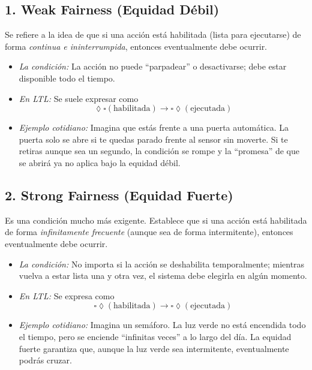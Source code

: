 \documentclass[11pt,a4paper]{article}
\begin{document}
\subsection{1. Weak Fairness (Equidad Débil)}

Se refiere a la idea de que si una acción está habilitada (lista para ejecutarse) de forma \textit{continua e ininterrumpida}, entonces eventualmente debe ocurrir.

\begin{itemize}
    \item \textit{La condición:} La acción no puede ``parpadear'' o desactivarse; debe estar disponible todo el tiempo.
    
    \item \textit{En LTL:} Se suele expresar como
    \[
    \lozenge \square (\text{habilitada}) \rightarrow \square \lozenge (\text{ejecutada})
    \]
    
    \item \textit{Ejemplo cotidiano:} Imagina que estás frente a una puerta automática. La puerta solo se abre si te quedas parado frente al sensor sin moverte. Si te retiras aunque sea un segundo, la condición se rompe y la ``promesa'' de que se abrirá ya no aplica bajo la equidad débil.
\end{itemize}

\subsection{2. Strong Fairness (Equidad Fuerte)}

Es una condición mucho más exigente. Establece que si una acción está habilitada de forma \textit{infinitamente frecuente} (aunque sea de forma intermitente), entonces eventualmente debe ocurrir.

\begin{itemize}
    \item \textit{La condición:} No importa si la acción se deshabilita temporalmente; mientras vuelva a estar lista una y otra vez, el sistema debe elegirla en algún momento.
    
    \item \textit{En LTL:} Se expresa como
    \[
    \square \lozenge (\text{habilitada}) \rightarrow \square \lozenge (\text{ejecutada})
    \]
    
    \item \textit{Ejemplo cotidiano:} Imagina un semáforo. La luz verde no está encendida todo el tiempo, pero se enciende ``infinitas veces'' a lo largo del día. La equidad fuerte garantiza que, aunque la luz verde sea intermitente, eventualmente podrás cruzar.
\end{itemize}
\end{document}
